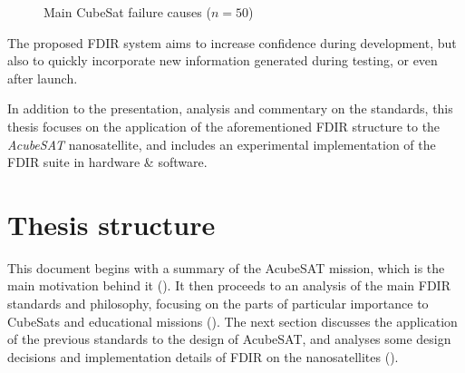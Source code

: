 \documentclass[a4paper,nobib]{tufte-book}
\begin{document}
\begin{figure}
	\centering
	\caption[Main CubeSat failure causes]{Main CubeSat failure causes (\(n=50\)) \autocite{bouwmeester_survey_implementation_2017}}
	\label{fig:whyfail}
\end{figure}

The proposed \acs{FDIR} system aims to increase confidence during development, but also to quickly incorporate new information generated during testing, or even after launch.

In addition to the presentation, analysis and commentary on the standards, this thesis focuses on the application of the aforementioned \acs{FDIR} structure to the \emph{AcubeSAT} nanosatellite, and includes an experimental implementation of the \acs{FDIR} suite in hardware \& software.

\section{Thesis structure}

This document begins with a summary of the AcubeSAT mission, which is the main motivation behind it (). It then proceeds to an analysis of the main \acs{FDIR} standards and philosophy, focusing on the parts of particular importance to CubeSats and educational missions (). The next section discusses the application of the previous standards to the design of AcubeSAT, and analyses some design decisions and implementation details of \acs{FDIR} on the nanosatellites ().
\end{document}
